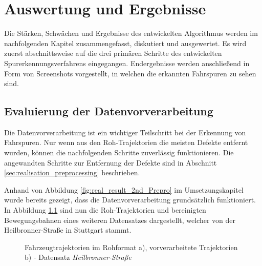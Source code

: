 
\chapter{Auswertung und Ergebnisse}
\label{cha:results}

Die Stärken, Schwächen und Ergebnisse des entwickelten Algorithmus werden im nachfolgenden Kapitel
zusammengefasst, diskutiert und ausgewertet. Es wird zuerst abschnittsweise auf die drei primären Schritte
des entwickelten Spurerkennungsverfahrens eingegangen. Endergebnisse werden anschließend
in Form von Screenshots vorgestellt, in welchen die erkannten Fahrspuren zu sehen sind.

\section{Evaluierung der Datenvorverarbeitung}
\label{sec:results_eval_dataprocessing}

Die Datenvorverarbeitung ist ein wichtiger Teilschritt bei der Erkennung von Fahrspuren. Nur wenn aus
den Roh-Trajektorien die meisten Defekte entfernt wurden, können die nachfolgenden
Schritte zuverlässig funktionieren. Die angewandten Schritte zur
Entfernung der Defekte sind in Abschnitt \ref{sec:realisation_preprocessing} beschrieben.

Anhand von Abbildung \ref{fig:real_result_2nd_Prepro} im Umsetzungskapitel wurde bereits gezeigt,
dass die Datenvorverarbeitung grundsätzlich funktioniert.
In Abbildung \ref{fig:results_prePro_heilbronner} sind nun die Roh-Trajektorien und bereinigten Bewegungsbahnen
eines weiteren Datensatzes dargestellt, welcher von der Heilbronner-Straße in Stuttgart stammt.

\begin{figure}[H]
    \centering
    \qquad \qquad
    \caption[Ergebnis Trajektorie-Vorverarbeitung der Heilbronner-Straße]
            {Fahrzeugtrajektorien im Rohformat a), vorverarbeitete Trajektorien b) - Datensatz \textit{Heilbronner-Straße}}
    \label{fig:results_prePro_heilbronner}
\end{figure}

